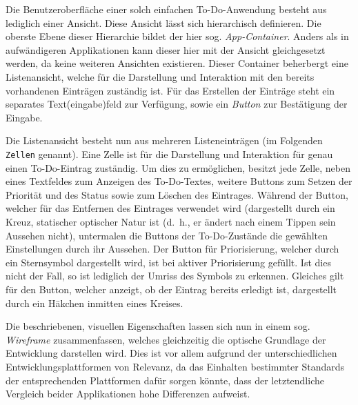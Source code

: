 Die Benutzeroberfläche einer solch einfachen To-Do-Anwendung besteht aus lediglich einer Ansicht. Diese Ansicht lässt sich hierarchisch definieren. Die oberste Ebene dieser Hierarchie bildet der hier sog. \textit{App-Container}. Anders als in aufwändigeren Applikationen kann dieser hier mit der Ansicht gleichgesetzt werden, da keine weiteren Ansichten existieren. Dieser Container beherbergt eine Listenansicht, welche für die Darstellung und Interaktion mit den bereits vorhandenen Einträgen zuständig ist. Für das Erstellen der Einträge steht ein separates Text(eingabe)feld zur Verfügung, sowie ein \textit{Button} zur Bestätigung der Eingabe.

Die Listenansicht besteht nun aus mehreren Listeneinträgen (im Folgenden \texttt{Zellen} genannt). Eine Zelle ist für die Darstellung und Interaktion für genau einen To-Do-Eintrag zuständig. Um dies zu ermöglichen, besitzt jede Zelle, neben eines Textfeldes zum Anzeigen des To-Do-Textes, weitere Buttons zum Setzen der Priorität und des Status sowie zum Löschen des Eintrages. Während der Button, welcher für das Entfernen des Eintrages verwendet wird (dargestellt durch ein Kreuz, statischer optischer Natur ist (d.\ h., er ändert nach einem Tippen sein Aussehen nicht), untermalen die Buttons der To-Do-Zustände die gewählten Einstellungen durch ihr Aussehen. Der Button für Priorisierung, welcher durch ein Sternsymbol dargestellt wird, ist bei aktiver Priorisierung gefüllt. Ist dies nicht der Fall, so ist lediglich der Umriss des Symbols zu erkennen. Gleiches gilt für den Button, welcher anzeigt, ob der Eintrag bereits erledigt ist, dargestellt durch ein Häkchen inmitten eines Kreises.

Die beschriebenen, visuellen Eigenschaften lassen sich nun in einem sog. \textit{Wireframe} zusammenfassen, welches gleichzeitig die optische Grundlage der Entwicklung darstellen wird. Dies ist vor allem aufgrund der unterschiedlichen Entwicklungsplattformen von Relevanz, da das Einhalten bestimmter Standards der entsprechenden Plattformen dafür sorgen könnte, dass der letztendliche Vergleich beider Applikationen hohe Differenzen aufweist.

